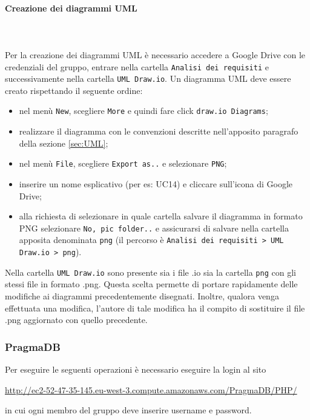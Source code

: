 	\paragraph{Creazione dei diagrammi UML} \mbox{}\\ \mbox{}\\
	Per la creazione dei diagrammi UML\glo{} è necessario accedere a Google Drive 
	con le credenziali del gruppo, entrare nella cartella \texttt{Analisi dei requisiti} e 
	successivamente nella cartella \texttt{UML Draw.io}. Un diagramma UML deve essere creato
	rispettando il seguente ordine:
		\begin{itemize}
			\item nel menù \texttt{New}, scegliere \texttt{More} e quindi fare
				click \texttt{draw.io Diagrams};
			\item realizzare il diagramma con le convenzioni descritte nell'apposito
				paragrafo della sezione \ref{sec:UML}; 
			\item nel menù \texttt{File}, scegliere \texttt{Export as..} e selezionare \texttt{PNG};
			\item inserire un nome esplicativo (per es: UC14) e cliccare sull'icona di
				Google Drive;
			\item alla richiesta di selezionare in quale cartella salvare il diagramma 
				in formato PNG selezionare \texttt{No, pic folder..} e assicurarsi di salvare 
				nella cartella apposita denominata \texttt{png} (il percorso è 
				\texttt{Analisi dei requisiti > UML Draw.io > png}).
		\end{itemize}
	Nella cartella \texttt{UML Draw.io} sono presente sia i file .io sia la cartella \texttt{png}
	con gli stessi file in formato .png. Questa scelta permette di portare rapidamente 
	delle modifiche ai diagrammi precedentemente disegnati. Inoltre, qualora venga 
	effettuata una modifica, l'autore di tale modifica ha il compito di sostituire
	il file .png aggiornato con quello precedente. 
	
	\subsubsection{PragmaDB} 
	Per eseguire le seguenti operazioni è necessario eseguire la login al sito \\
	\centerline{\url{http://ec2-52-47-35-145.eu-west-3.compute.amazonaws.com/PragmaDB/PHP/}}
	in cui ogni membro del gruppo deve inserire username e password.
	
